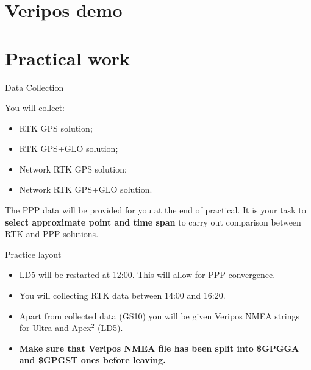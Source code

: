 \documentclass[11pt]{beamer}
\begin{document}
\section{Veripos demo}



\section{Practical work}



\begin{frame}{Data Collection}
	
	You will  collect:
		\begin{itemize}
			\item RTK GPS solution;
			\item RTK GPS+GLO solution;
			\item Network RTK GPS solution;
			\item Network RTK GPS+GLO solution.
		\end{itemize}

	The PPP data will be provided for you at the end of practical. It is your task to \textbf{select approximate point and time span} to carry out comparison between RTK and PPP solutions. 

\end{frame}



\begin{frame}{Practice layout}
	
	\begin{itemize}
		\item LD5 will be restarted at 12:00. This will allow for PPP convergence. 
		\item You will collecting RTK data between 14:00 and 16:20. 
		\item Apart from collected data (GS10) you will be given Veripos NMEA strings for Ultra and Apex$^2$ (LD5).
		\item \textbf{Make sure that Veripos NMEA file has been split into \$GPGGA and \$GPGST ones before leaving.}
	\end{itemize}

\end{frame}
\end{document}
